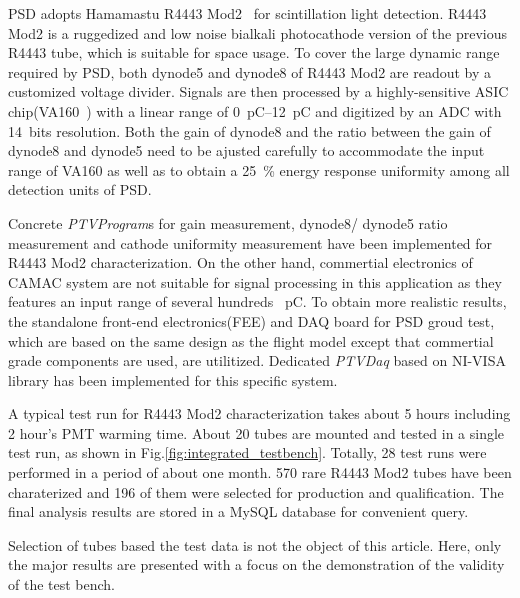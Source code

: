 \documentclass[review,number,sort&compress]{elsarticle}
\begin{document}
PSD adopts Hamamastu R4443 Mod2~\cite{r4443_mod2} for scintillation light detection.
R4443 Mod2 is a ruggedized and low noise bialkali photocathode version of the previous R4443 tube, which is suitable for space usage. 
To cover the large dynamic range required by PSD, both dynode5 and dynode8 of R4443 Mod2 are readout by a customized voltage divider.
Signals are then processed by a highly-sensitive ASIC chip(VA160~\cite{va160}) with a linear range of \SIrange{0}{12}{\pico\coulomb} and digitized by an ADC with 14~bits resolution.
Both the gain of dynode8 and the ratio between the gain of dynode8 and dynode5 need to be ajusted carefully to accommodate the input range of VA160 as well as to obtain a \SI{25}{\percent} energy response uniformity among all detection units of PSD.

Concrete \textit{PTVProgram}s for gain measurement, dynode8/ dynode5 ratio measurement and cathode uniformity measurement have been implemented for R4443 Mod2 characterization.
On the other hand, commertial electronics of CAMAC system are not suitable for signal processing in this application as they features an input range of several hundreds \SI{}{\pico\coulomb}.
To obtain more realistic results, the standalone front-end electronics(FEE) and DAQ board for PSD groud test, which are based on the same design as the flight model except that commertial grade components are used, are utilitized.
Dedicated \textit{PTVDaq} based on NI-VISA library has been implemented for this specific system.

A typical test run for R4443 Mod2 characterization takes about 5 hours including 2 hour's PMT warming time.
About 20 tubes are mounted and tested in a single test run, as shown in Fig.\ref{fig:integrated_testbench}.
Totally, 28 test runs were performed in a period of about one month.
570 rare R4443 Mod2 tubes have been charaterized and 196 of them were selected for production and qualification.
The final analysis results are stored in a MySQL database for convenient query.

Selection of tubes based the test data is not the object of this article.
Here, only the major results are presented with a focus on the demonstration of the validity of the test bench. 
\end{document}
